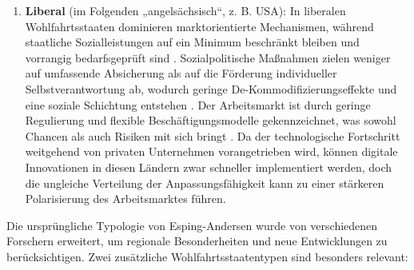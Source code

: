 \begin{enumerate}
    \item \textbf{Liberal} (im Folgenden „angelsächsisch“, z. B. USA): In liberalen 
    Wohlfahrtsstaaten dominieren marktorientierte Mechanismen, während staatliche 
    Sozialleistungen auf ein Minimum beschränkt bleiben und vorrangig bedarfsgeprüft sind 
    \parencite[vgl.][S. 26–27]{espingandersen1990thethree}. Sozialpolitische Maßnahmen zielen 
    weniger auf umfassende Absicherung als auf die Förderung individueller Selbstverantwortung 
    ab, wodurch geringe De-Kommodifizierungseffekte und eine soziale Schichtung entstehen 
    \parencite[vgl.][S. 27]{espingandersen1990thethree}. Der Arbeitsmarkt ist durch geringe 
    Regulierung und flexible Beschäftigungsmodelle gekennzeichnet, was sowohl Chancen als auch 
    Risiken mit sich bringt \parencite[vgl.][S. 28–30]{hall2001varieties}. Da der technologische 
    Fortschritt weitgehend von privaten Unternehmen vorangetrieben wird, können digitale 
    Innovationen in diesen Ländern zwar schneller implementiert werden, doch die ungleiche 
    Verteilung der Anpassungsfähigkeit kann zu einer stärkeren Polarisierung des 
    Arbeitsmarktes führen.

\end{enumerate}

Die ursprüngliche Typologie von Esping-Andersen wurde von verschiedenen Forschern 
erweitert, um regionale Besonderheiten und neue Entwicklungen zu berücksichtigen. Zwei 
zusätzliche Wohlfahrtsstaatentypen sind besonders relevant:

